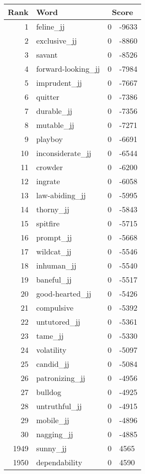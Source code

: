 \begin{longtable}[!htbp]{| rlr@{.}l |}
    \hline
    \textbf{Rank} & \textbf{Word} & \multicolumn{2}{c|}{\textbf{Score}} \\
    \hline
    \endhead
    1 & feline\_jj & 0 & -9633 \\
    2 & exclusive\_jj & 0 & -8860 \\
    3 & savant & 0 & -8526 \\
    4 & forward-looking\_jj & 0 & -7984 \\
    5 & imprudent\_jj & 0 & -7667 \\
    6 & quitter & 0 & -7386 \\
    7 & durable\_jj & 0 & -7356 \\
    8 & mutable\_jj & 0 & -7271 \\
    9 & playboy & 0 & -6691 \\
    10 & inconsiderate\_jj & 0 & -6544 \\
    11 & crowder & 0 & -6200 \\
    12 & ingrate & 0 & -6058 \\
    13 & law-abiding\_jj & 0 & -5995 \\
    14 & thorny\_jj & 0 & -5843 \\
    15 & spitfire & 0 & -5715 \\
    16 & prompt\_jj & 0 & -5668 \\
    17 & wildcat\_jj & 0 & -5546 \\
    18 & inhuman\_jj & 0 & -5540 \\
    19 & baneful\_jj & 0 & -5517 \\
    20 & good-hearted\_jj & 0 & -5426 \\
    21 & compulsive & 0 & -5392 \\
    22 & untutored\_jj & 0 & -5361 \\
    23 & tame\_jj & 0 & -5330 \\
    24 & volatility & 0 & -5097 \\
    25 & candid\_jj & 0 & -5084 \\
    26 & patronizing\_jj & 0 & -4956 \\
    27 & bulldog & 0 & -4925 \\
    28 & untruthful\_jj & 0 & -4915 \\
    29 & mobile\_jj & 0 & -4896 \\
    30 & nagging\_jj & 0 & -4885 \\
    1949 & sunny\_jj & 0 & 4565 \\
    1950 & dependability & 0 & 4590 \\

\end{longtable}
